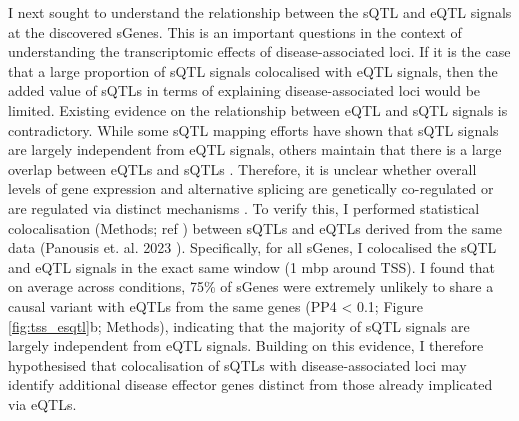 I next sought to understand the relationship between the sQTL and eQTL signals at the discovered sGenes. This is an important questions in the context of understanding the transcriptomic effects of disease-associated loci. If it is the case that a large proportion of sQTL signals colocalised with eQTL signals, then the added value of sQTLs in terms of explaining disease-associated loci would be limited. Existing evidence on the relationship between eQTL and sQTL signals is contradictory. While some sQTL mapping efforts have shown that sQTL signals are largely independent from eQTL signals, others maintain that there is a large overlap between eQTLs and sQTLs \cite{Garrido-Martin2021-sk,Kim-Hellmuth2020-gz,Wang2008-fb,Lappalainen2013-mz}. Therefore, it is unclear whether overall levels of gene expression and alternative splicing are genetically co-regulated or are regulated via distinct mechanisms \cite{Kim-Hellmuth2020-gz,Wang2008-fb,Lappalainen2013-mz}. To verify this, I performed statistical colocalisation (Methods; ref \cite{Giambartolomei2014-yl}) between sQTLs and eQTLs derived from the same data (Panousis et. al. 2023 \cite{macromap-eqtl}). Specifically, for all sGenes, I colocalised the sQTL and eQTL signals in the exact same window (1 mbp around TSS). I found that on average across conditions, 75\% of sGenes were extremely unlikely to share a causal variant with eQTLs from the same genes (PP4 < 0.1; Figure \ref{fig:tss_esqtl}b; Methods), indicating that the majority of sQTL signals are largely independent from eQTL signals. Building on this evidence, I therefore hypothesised that colocalisation of sQTLs with disease-associated loci may identify additional disease effector genes distinct from those already implicated via eQTLs. \\

